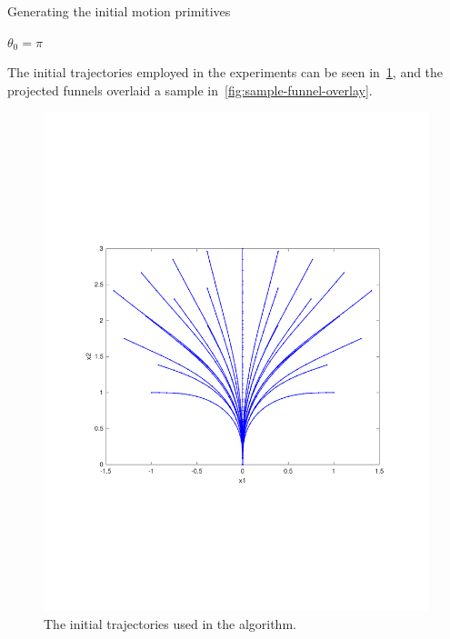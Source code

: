 \begin{algorithm}[H]
  \caption{Generating the initial motion primitives}
  \label{alg:initial-motion-primitives-generation}
  \DontPrintSemicolon \SetAlgoNoLine

   

  \(\theta_{0} = \pi\) \;

  \;
\end{algorithm}

The initial trajectories employed in the experiments can be seen
in~\cref{fig:intial-trajectories-exp}, and the projected funnels overlaid a
sample in~\cref{fig:sample-funnel-overlay}.

\begin{figure}
  \centering
  \includegraphics[scale=.5]{figures/experiments/initial-trajectories}
  \caption{The initial trajectories used in the \rrtfunnel{} algorithm.}
  \label{fig:intial-trajectories-exp}
\end{figure}

